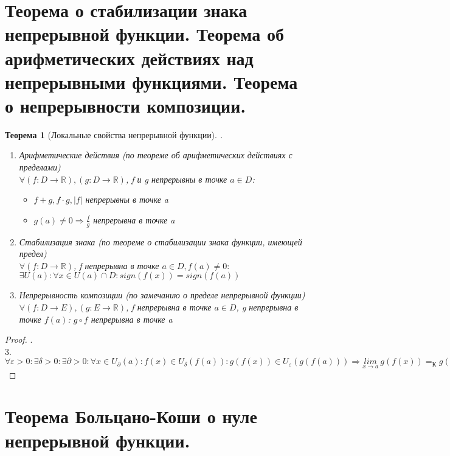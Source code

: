 \documentclass[12pt, a4]{article}
\newtheorem*{theorem}{Теорема}
\renewcommand{\lim}[2]{\underset{#1 \rightarrow #2}{lim}}
\renewcommand{\implies}{\Rightarrow}
\renewcommand{\epsilon}{\varepsilon}
\newcommand{\R}{\mathbb{R}}
\begin{document}
\section{Теорема о стабилизации знака непрерывной функции. Теорема об арифметических действиях над непрерывными функциями. Теорема о непрерывности композиции.}

\begin{theorem}[Локальные свойства непрерывной функции].\\
\begin{enumerate}
    \item Арифметические действия (по теореме об арифметических действиях с пределами)\\
        $\forall (f: D \to \R), (g: D \to \R)$, f и g непрерывны в точке $a \in D$:
        \begin{itemize}
            \item $f + g, f \cdot g, |f|$ непрерывны в точке a
            \item $g(a) \neq 0 \implies \frac{f}{g}$ непрерывна в точке a
        \end{itemize}
    \item Стабилизация знака (по теореме о стабилизации знака функции, имеющей предел)\\
        $\forall (f: D \to \R)$, f непрерывна в точке $a \in D, f(a) \neq 0:$\\
        $\exists U(a): \forall x \in U(a) \cap D: sign(f(x)) = sign(f(a))$
    \item Непрерывность композиции (по замечанию о пределе непрерывной функции)\\
        $\forall (f: D \to E), (g: E \to \R)$, f непрерывна в точке $a \in D$, g непрерывна в точке $f(a)$: $g \circ f$ непрерывна в точке a
\end{enumerate}
\end{theorem}

\begin{proof}.\\
3. $\forall \epsilon > 0: \exists \delta > 0: \exists \partial > 0: \forall x \in U_\partial(a): f(x) \in U_\delta(f(a)): g(f(x)) \in U_\epsilon(g(f(a))) \implies \lim{x}{a}\ g(f(x)) =_К g(f(x))$
\end{proof}

\section{Теорема Больцано-Коши о нуле непрерывной функции.}
\end{document}
